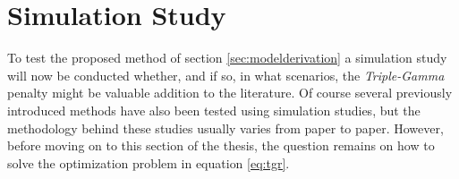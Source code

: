 \documentclass[12pt,a4paper]{article}
\newenvironment{lightbluebox}{%
    \begin{tcolorbox}[colback=lightblue, colframe=lightblue, fontupper=\itshape]%
}{%
    \end{tcolorbox}%
}
\begin{document}




\newpage
\section{Simulation Study}\label{sec:simstudy_overall}
To test the proposed method of section \ref{sec:modelderivation} a simulation study will now be conducted whether, and if so, in what scenarios, the \textit{Triple-Gamma} penalty might be valuable addition to the literature. Of course several previously introduced methods have also been tested using simulation studies, but the methodology behind these studies usually varies from paper to paper. However, before moving on to this section of the thesis, the question remains on how to solve the optimization problem in equation \ref{eq:tgr}. 
\end{document}
